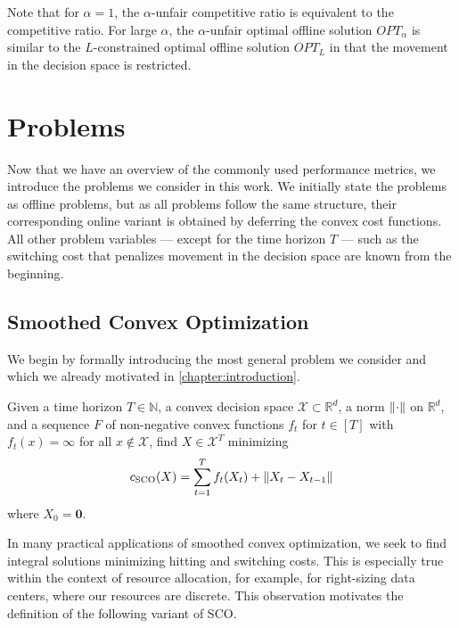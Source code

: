 Note that for $\alpha = 1$, the $\alpha$-unfair competitive ratio is equivalent to the competitive ratio. For large $\alpha$, the $\alpha$-unfair optimal offline solution $OPT_{\alpha}$ is similar to the $L$-constrained optimal offline solution $OPT_L$ in that the movement in the decision space is restricted.

\section{Problems}

Now that we have an overview of the commonly used performance metrics, we introduce the problems we consider in this work. We initially state the problems as offline problems, but as all problems follow the same structure, their corresponding online variant is obtained by deferring the convex cost functions. All other problem variables --- except for the time horizon $T$ --- such as the switching cost that penalizes movement in the decision space are known from the beginning.

\subsection{Smoothed Convex Optimization}

We begin by formally introducing the most general problem we consider and which we already motivated in \cref{chapter:introduction}.

\begin{problem}\label{problem:smoothed_convex_optimization}
Given a time horizon $T \in \mathbb{N}$, a convex decision space $\mathcal{X} \subset \mathbb{R}^d$, a norm $\lVert\cdot\rVert$ on $\mathbb{R}^d$, and a sequence $F$ of non-negative convex functions $f_t$ for $t \in [T]$ with $f_t(x) = \infty$ for all $x \not\in \mathcal{X}$, find $X \in \mathcal{X}^T$ minimizing \begin{align*}
    c_{\text{SCO}}(X) = \sum_{t=1}^T f_t(X_t) + \lVert X_t - X_{t-1}\rVert
\end{align*}
where $X_0 = \mathbf{0}$.
\end{problem}

In many practical applications of smoothed convex optimization, we seek to find integral solutions minimizing hitting and switching costs. This is especially true within the context of resource allocation, for example, for right-sizing data centers, where our resources are discrete. This observation motivates the definition of the following variant of SCO.

